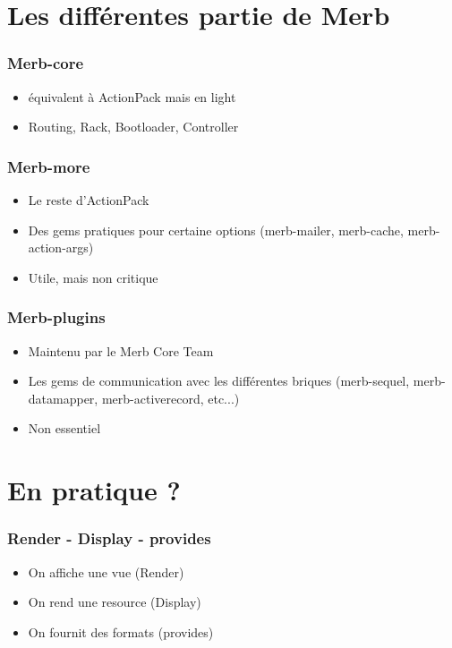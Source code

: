 \documentclass{beamer}
\begin{document}
\section{Les différentes partie de Merb}

\begin{frame}
    \frametitle{Merb-core}
    \begin{itemize}
        \item équivalent à ActionPack mais en light
        \item Routing, Rack, Bootloader, Controller
    \end{itemize}
\end{frame}

\begin{frame}
    \frametitle{Merb-more}
    \begin{itemize}
        \item Le reste d'ActionPack
        \item Des gems pratiques pour certaine options (merb-mailer,
                merb-cache, merb-action-args)
        \item Utile, mais non critique
    \end{itemize}
\end{frame}

\begin{frame}
    \frametitle{Merb-plugins}
    \begin{itemize}
        \item Maintenu par le Merb Core Team
        \item Les gems de communication avec les différentes briques
        (merb-sequel, merb-datamapper, merb-activerecord, etc...)
        \item Non essentiel
    \end{itemize}
\end{frame}

\section{En pratique ?}

\begin{frame}
    \frametitle{Render - Display - provides}
    \begin{itemize}
        \item On affiche une vue (Render)
        \item On rend une resource (Display)
        \item On fournit des formats (provides)
    \end{itemize}
\end{frame}
\end{document}
